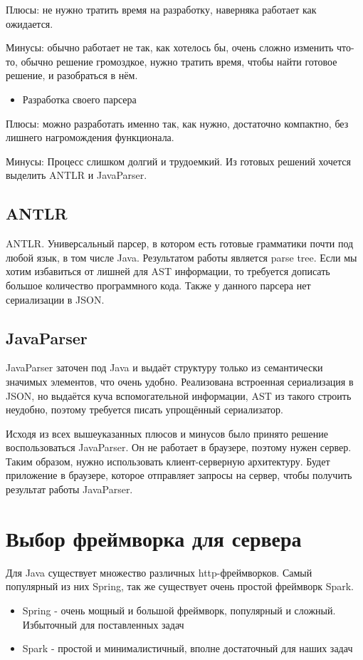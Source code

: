 Плюсы: не нужно тратить время на разработку, наверняка работает как ожидается.

Минусы: обычно работает не так, как хотелось бы, очень сложно изменить что-то, обычно решение громоздкое, нужно тратить время, чтобы найти готовое решение, и разобраться в нём.
\begin{itemize}
\item Разработка своего парсера
\end{itemize}

Плюсы: можно разработать именно так, как нужно, достаточно компактно, без лишнего нагромождения функционала.

Минусы: Процесс слишком долгий и трудоемкий.
Из готовых решений хочется выделить ANTLR и JavaParser.
\subsection{ANTLR} \label{ch2:subsec-title-abbr}
ANTLR. Универсальный парсер, в котором есть готовые грамматики почти под любой язык, в том числе Java. Результатом работы является parse tree. Если мы хотим избавиться от лишней для AST информации, то требуется дописать большое количество программного кода. Также у данного парсера нет сериализации в JSON.
\subsection{JavaParser} \label{ch2:subsec-title-abbr}
JavaParser заточен под Java и выдаёт структуру только из семантически значимых элементов, что очень удобно. Реализована встроенная сериализация в JSON, но выдаётся куча вспомогательной информации, AST из такого строить неудобно, поэтому требуется писать упрощённый сериализатор.

Исходя из всех вышеуказанных плюсов и минусов было принято решение воспользоваться JavaParser. Он не работает в браузере, поэтому нужен сервер. Таким образом, нужно использовать клиент-серверную архитектуру. Будет приложение в браузере, которое отправляет запросы на сервер, чтобы получить результат работы JavaParser.
\section{Выбор фреймворка для сервера} \label{ch4:sec2}
Для Java существует множество различных http-фреймворков. Самый популярный из них Spring, так же существует очень простой фреймворк Spark.
\begin{itemize}
\item Spring - очень мощный и большой фреймворк, популярный и сложный. Избыточный для поставленных задач
\item Spark - простой и минималистичный, вполне достаточный для наших задач
\end{itemize}
